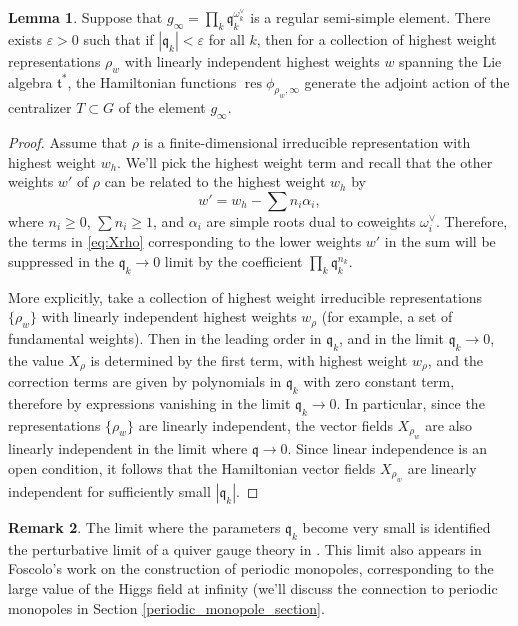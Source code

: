 \documentclass[11pt, oneside, reqno]{amsart}
\theoremstyle{definition} \newtheorem{definition}{Definition}[section]
\newtheorem{lemma}[definition]{Lemma}
\theoremstyle{definition} \newtheorem{remark}[definition]{Remark}
\theoremstyle{definition} \newtheorem{remarks}[definition]{Remarks}
\theoremstyle{definition} \newtheorem{question}[definition]{Question}
\theoremstyle{definition} \newtheorem*{note}{Note}
\theoremstyle{definition} \newtheorem{example}[definition]{Example}
\theoremstyle{definition} \newtheorem{examples}[definition]{Examples}
\newcommand{\qq}{\mathfrak{q}}
\newcommand{\mf}[1]{\mathfrak{#1}}
\newcommand{\eps}{\varepsilon}
\DeclareMathOperator{\res}{res}
\begin{document}
\begin{lemma}\label{lemma:smallq}
  Suppose that $g_\infty = \prod_{k} \qq_k ^{\omega_k^{\vee}}$ is a regular semi-simple element.  There exists $\eps > 0$ such that if $|\qq_k| < \eps$ for all $k$, then for a collection of highest weight representations $\rho_w$ with linearly independent highest weights $w$ spanning the Lie algebra $\mf t^*$, the Hamiltonian functions $\res \phi_{\rho_w, \infty}$ generate the adjoint action of the centralizer $T \subset G$ of the element $g_\infty$. 
\end{lemma}  

\begin{proof}
Assume that $\rho$ is a finite-dimensional irreducible representation with highest weight $w_h$.
  We'll pick the highest weight term and recall that the other weights $w'$ of $\rho$ can be related to the highest weight $w_{h}$ by 
  \[w' = w_{h} - \sum {n_i \alpha_i},\]
  where $n_i \geq 0$,  $\sum n_i \geq 1$, and $\alpha_i$ are simple roots dual to coweights $\omega_i^{\vee}$.
  Therefore, the terms in \ref{eq:Xrho} corresponding to the lower weights $w'$ in the sum will be suppressed in the $\qq_k \to 0$ limit by the coefficient $\prod_{k} \qq_k^{n_k}$.
  
  More explicitly, take a collection of highest weight irreducible representations $\{\rho_{w}\}$ with linearly independent highest weights $w_{\rho}$ (for example, a set of fundamental weights). Then in the leading order in $\qq_k$, and in the limit $\qq_k \to 0$, the value $X_{\rho}$ is determined by the first term, with highest weight $w_{\rho}$, and the correction terms are given by polynomials in $\qq_k$ with zero constant term, therefore by expressions vanishing in the limit $\qq_k \to 0$. In particular, since the representations $\{\rho_w\}$ are linearly independent, the vector fields $X_{\rho_{w}}$ are also linearly independent in the limit where $\qq \to 0$.  Since linear independence is an open condition, it follows that the Hamiltonian vector fields $X_{\rho_w}$ are linearly independent for sufficiently small $|\qq_k|$.
\end{proof}

\begin{remark}
  The limit where the parameters $\qq_k$ become very small is identified the perturbative limit of a quiver gauge theory in \cite{NekrasovPestun}.  This limit also appears in Foscolo's work \cite{FoscoloGluing} on the construction of periodic monopoles, corresponding to the large value of the Higgs field at infinity (we'll discuss the connection to periodic monopoles in Section \ref{periodic_monopole_section}. 
\end{remark}
\end{document}
